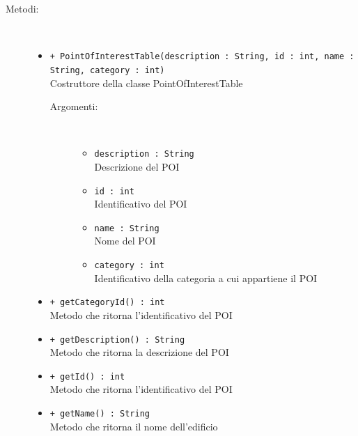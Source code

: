\documentclass[../DefinizioneDiProdotto.tex]{subfiles}
\begin{document}
\begin{description}
\begin{itemize}
	\end{itemize}
	\item[Metodi:] \
	\begin{itemize}
		\item \texttt{+ PointOfInterestTable(description : String, id : int, name : String, category : int)}\\
		Costruttore della classe PointOfInterestTable
		\begin{description}
			\item[Argomenti:] \
			\begin{itemize}
				\item \texttt{description : String}\\
				Descrizione del POI\item \texttt{id : int}\\
				Identificativo del POI\item \texttt{name : String}\\
				Nome del POI\item \texttt{category : int}\\
				Identificativo della categoria a cui appartiene il POI\end{itemize}
		\end{description}
		\item \texttt{+ getCategoryId() : int}\\
		Metodo che ritorna l'identificativo del POI
		\item \texttt{+ getDescription() : String}\\
		Metodo che ritorna la descrizione del POI
		\item \texttt{+ getId() : int}\\
		Metodo che ritorna l'identificativo del POI
		\item \texttt{+ getName() : String}\\
		Metodo che ritorna il nome dell'edificio
	\end{itemize}
\end{description}
\end{document}

